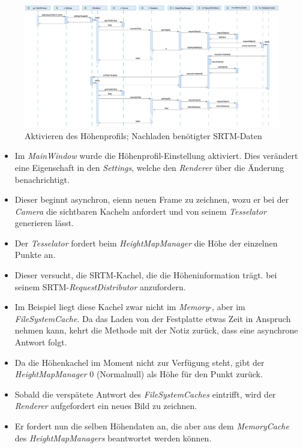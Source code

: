\documentclass[10pt]{scrreprt}
\begin{document}
\vspace*{5mm}
\begin{figure}[h]
\begin{center}
\includegraphics[scale=0.28]{sequenz-height.eps}
\caption{Aktivieren des Höhenprofils; Nachladen benötigter SRTM-Daten}
\end{center}
\end{figure}

\begin{itemize}
\item Im \textit{MainWindow} wurde die Höhenprofil-Einstellung aktiviert. Dies verändert eine Eigenschaft in den \textit{Settings}, welche den \textit{Renderer} über die Änderung benachrichtigt.
\item Dieser beginnt asynchron, eienn neuen Frame zu zeichnen, wozu er bei der \textit{Camera} die sichtbaren Kacheln anfordert und von seinem \textit{Tesselator} generieren lässt.
\item Der \textit{Tesselator} fordert beim \textit{HeightMapManager} die Höhe der einzelnen Punkte an.
\item Dieser versucht, die SRTM-Kachel, die die Höheninformation trägt. bei seinem SRTM-\textit{RequestDistributor} anzufordern.
\item Im Beispiel liegt diese Kachel zwar nicht im \textit{Memory}-, aber im \textit{FileSystemCache}. Da das Laden von der Festplatte etwas Zeit in Anspruch nehmen kann, kehrt die Methode mit der Notiz zurück, dass eine asynchrone Antwort folgt.
\item Da die Höhenkachel im Moment nicht zur Verfügung steht, gibt der \textit{HeightMapManager} 0 (Normalnull) als Höhe für den Punkt zurück.
\item Sobald die verspätete Antwort des \textit{FileSystemCaches} eintrifft, wird der \textit{Renderer} aufgefordert ein neues Bild zu zeichnen.
\item Er fordert nun die selben Höhendaten an, die aber aus dem \textit{MemoryCache} des \textit{HeightMapManagers} beantwortet werden können.
\end{itemize}
\end{document}
